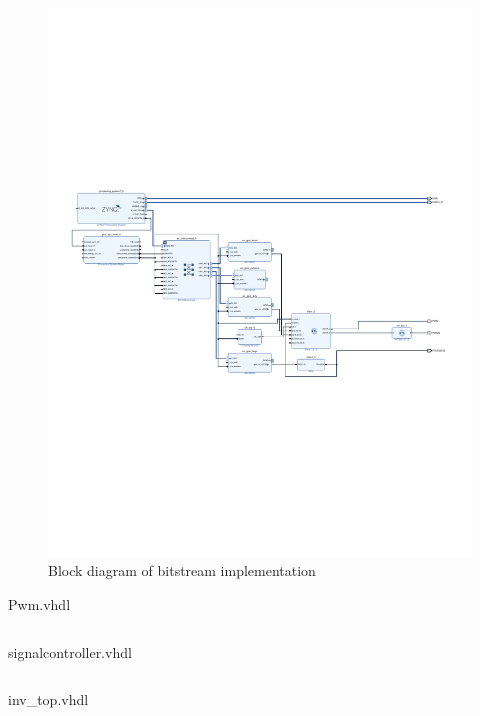 \begin{figure}[htbp!]
	\centering
	\includegraphics[width=\textwidth]{Figures/appendix/fpga/design_1.pdf}
	\caption{Block diagram of bitstream implementation}
	\label{fig:app_fpga_block_diagram}
\end{figure}
\begin{longlisting}
	\caption{Pwm.vhdl}
	\label{lst:Pwm.vhdl}
	\inputminted[bgcolor=LightGray,fontsize=\footnotesize,linenos,breaklines]{vhdl}{Figures/appendix/fpga/Pwm.vhdl}
\end{longlisting}
\begin{longlisting}
	\caption{signalcontroller.vhdl}
	\label{lst:signalcontroller.vhdl}
	\inputminted[bgcolor=LightGray,fontsize=\footnotesize,linenos,breaklines]{vhdl}{Figures/appendix/fpga/signalcontroller.vhdl}
\end{longlisting}
\begin{longlisting}
	\caption{inv\_top.vhdl}
	\label{lst:inv_top.vhdl}
	\inputminted[bgcolor=LightGray,fontsize=\footnotesize,linenos,breaklines]{vhdl}{Figures/appendix/fpga/inv_top.vhdl}
\end{longlisting}
